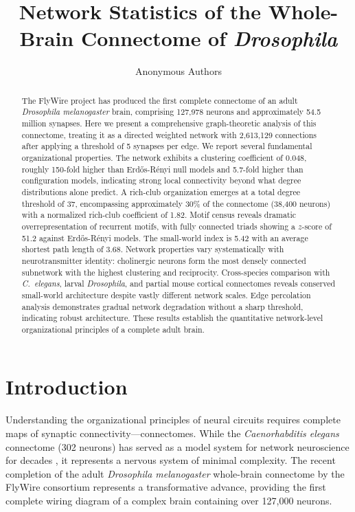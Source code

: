 \documentclass[11pt]{article}
\title{Network Statistics of the Whole-Brain Connectome of \textit{Drosophila}}
\author{Anonymous Authors}
\date{}
\begin{document}
\maketitle

\begin{abstract}
The FlyWire project has produced the first complete connectome of an adult \textit{Drosophila melanogaster} brain, comprising 127,978 neurons and approximately 54.5 million synapses. Here we present a comprehensive graph-theoretic analysis of this connectome, treating it as a directed weighted network with 2,613,129 connections after applying a threshold of 5 synapses per edge. We report several fundamental organizational properties. The network exhibits a clustering coefficient of 0.048, roughly 150-fold higher than Erd\H{o}s-R\'{e}nyi null models and 5.7-fold higher than configuration models, indicating strong local connectivity beyond what degree distributions alone predict. A rich-club organization emerges at a total degree threshold of 37, encompassing approximately 30\% of the connectome (38,400 neurons) with a normalized rich-club coefficient of 1.82. Motif census reveals dramatic overrepresentation of recurrent motifs, with fully connected triads showing a $z$-score of 51.2 against Erd\H{o}s-R\'{e}nyi models. The small-world index is 5.42 with an average shortest path length of 3.68. Network properties vary systematically with neurotransmitter identity: cholinergic neurons form the most densely connected subnetwork with the highest clustering and reciprocity. Cross-species comparison with \textit{C.\ elegans}, larval \textit{Drosophila}, and partial mouse cortical connectomes reveals conserved small-world architecture despite vastly different network scales. Edge percolation analysis demonstrates gradual network degradation without a sharp threshold, indicating robust architecture. These results establish the quantitative network-level organizational principles of a complete adult brain.
\end{abstract}

\section{Introduction}

Understanding the organizational principles of neural circuits requires complete maps of synaptic connectivity---connectomes. While the \textit{Caenorhabditis elegans} connectome (302 neurons) has served as a model system for network neuroscience for decades \citep{white1986structure, varshney2011structural}, it represents a nervous system of minimal complexity. The recent completion of the adult \textit{Drosophila melanogaster} whole-brain connectome by the FlyWire consortium \citep{dorkenwald2024flywire, schlegel2024whole} represents a transformative advance, providing the first complete wiring diagram of a complex brain containing over 127,000 neurons.
\end{document}
